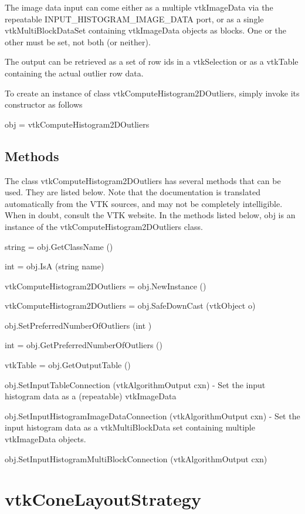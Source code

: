 The image data input can come either as a multiple vtk\-Image\-Data via the repeatable I\-N\-P\-U\-T\-\_\-\-H\-I\-S\-T\-O\-G\-R\-A\-M\-\_\-\-I\-M\-A\-G\-E\-\_\-\-D\-A\-T\-A port, or as a single vtk\-Multi\-Block\-Data\-Set containing vtk\-Image\-Data objects as blocks. One or the other must be set, not both (or neither).

The output can be retrieved as a set of row ids in a vtk\-Selection or as a vtk\-Table containing the actual outlier row data.

To create an instance of class vtk\-Compute\-Histogram2\-D\-Outliers, simply invoke its constructor as follows \begin{DoxyVerb}  obj = vtkComputeHistogram2DOutliers
\end{DoxyVerb}
 \hypertarget{vtkwidgets_vtkxyplotwidget_Methods}{}\subsection{Methods}\label{vtkwidgets_vtkxyplotwidget_Methods}
The class vtk\-Compute\-Histogram2\-D\-Outliers has several methods that can be used. They are listed below. Note that the documentation is translated automatically from the V\-T\-K sources, and may not be completely intelligible. When in doubt, consult the V\-T\-K website. In the methods listed below, {\ttfamily obj} is an instance of the vtk\-Compute\-Histogram2\-D\-Outliers class. 
\begin{DoxyItemize}
\item {\ttfamily string = obj.\-Get\-Class\-Name ()}  
\item {\ttfamily int = obj.\-Is\-A (string name)}  
\item {\ttfamily vtk\-Compute\-Histogram2\-D\-Outliers = obj.\-New\-Instance ()}  
\item {\ttfamily vtk\-Compute\-Histogram2\-D\-Outliers = obj.\-Safe\-Down\-Cast (vtk\-Object o)}  
\item {\ttfamily obj.\-Set\-Preferred\-Number\-Of\-Outliers (int )}  
\item {\ttfamily int = obj.\-Get\-Preferred\-Number\-Of\-Outliers ()}  
\item {\ttfamily vtk\-Table = obj.\-Get\-Output\-Table ()}  
\item {\ttfamily obj.\-Set\-Input\-Table\-Connection (vtk\-Algorithm\-Output cxn)} -\/ Set the input histogram data as a (repeatable) vtk\-Image\-Data  
\item {\ttfamily obj.\-Set\-Input\-Histogram\-Image\-Data\-Connection (vtk\-Algorithm\-Output cxn)} -\/ Set the input histogram data as a vtk\-Multi\-Block\-Data set containing multiple vtk\-Image\-Data objects.  
\item {\ttfamily obj.\-Set\-Input\-Histogram\-Multi\-Block\-Connection (vtk\-Algorithm\-Output cxn)}  
\end{DoxyItemize}\hypertarget{vtkinfovis_vtkconelayoutstrategy}{}\section{vtk\-Cone\-Layout\-Strategy}\label{vtkinfovis_vtkconelayoutstrategy}
